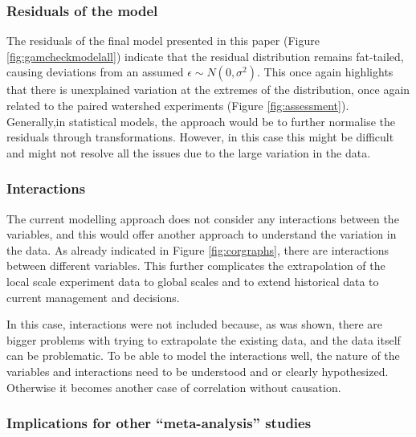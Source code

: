 \documentclass[]{elsarticle} %
\begin{document}
\hypertarget{residuals-of-the-model}{%
\subsubsection{Residuals of the model}\label{residuals-of-the-model}}

The residuals of the final model presented in this paper (Figure \ref{fig:gamcheckmodelall}) indicate that the residual distribution remains fat-tailed, causing deviations from an assumed \(\epsilon \sim N(0,\sigma^2)\). This once again highlights that there is unexplained variation at the extremes of the distribution, once again related to the paired watershed experiments (Figure \ref{fig:assessment}). Generally,in statistical models, the approach would be to further normalise the residuals through transformations. However, in this case this might be difficult and might not resolve all the issues due to the large variation in the data.

\hypertarget{interactions}{%
\subsubsection{Interactions}\label{interactions}}

The current modelling approach does not consider any interactions between the variables, and this would offer another approach to understand the variation in the data. As already indicated in Figure \ref{fig:corgraphs}, there are interactions between different variables. This further complicates the extrapolation of the local scale experiment data to global scales and to extend historical data to current management and decisions.

In this case, interactions were not included because, as was shown, there are bigger problems with trying to extrapolate the existing data, and the data itself can be problematic. To be able to model the interactions well, the nature of the variables and interactions need to be understood and or clearly hypothesized. Otherwise it becomes another case of correlation without causation.

\hypertarget{implications-for-other-meta-analysis-studies}{%
\subsubsection{Implications for other ``meta-analysis'' studies}\label{implications-for-other-meta-analysis-studies}}
\end{document}
